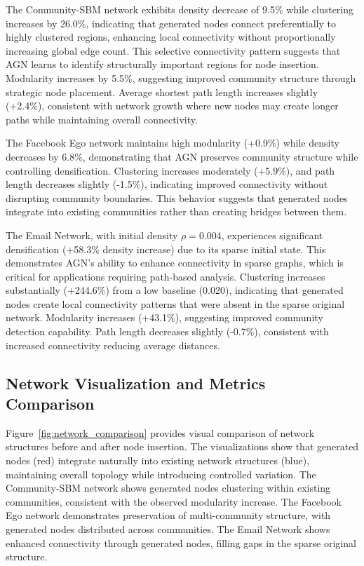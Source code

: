 \documentclass[12pt]{article}
\begin{document}
The Community-SBM network exhibits density decrease of 9.5\% while clustering increases by 26.0\%, indicating that generated nodes connect preferentially to highly clustered regions, enhancing local connectivity without proportionally increasing global edge count. This selective connectivity pattern suggests that AGN learns to identify structurally important regions for node insertion. Modularity increases by 5.5\%, suggesting improved community structure through strategic node placement. Average shortest path length increases slightly (+2.4\%), consistent with network growth where new nodes may create longer paths while maintaining overall connectivity.

The Facebook Ego network maintains high modularity (+0.9\%) while density decreases by 6.8\%, demonstrating that AGN preserves community structure while controlling densification. Clustering increases moderately (+5.9\%), and path length decreases slightly (-1.5\%), indicating improved connectivity without disrupting community boundaries. This behavior suggests that generated nodes integrate into existing communities rather than creating bridges between them.

The Email Network, with initial density $\rho = 0.004$, experiences significant densification (+58.3\% density increase) due to its sparse initial state. This demonstrates AGN's ability to enhance connectivity in sparse graphs, which is critical for applications requiring path-based analysis. Clustering increases substantially (+244.6\%) from a low baseline (0.020), indicating that generated nodes create local connectivity patterns that were absent in the sparse original network. Modularity increases (+43.1\%), suggesting improved community detection capability. Path length decreases slightly (-0.7\%), consistent with increased connectivity reducing average distances.

\subsection{Network Visualization and Metrics Comparison}

Figure~\ref{fig:network_comparison} provides visual comparison of network structures before and after node insertion. The visualizations show that generated nodes (red) integrate naturally into existing network structures (blue), maintaining overall topology while introducing controlled variation. The Community-SBM network shows generated nodes clustering within existing communities, consistent with the observed modularity increase. The Facebook Ego network demonstrates preservation of multi-community structure, with generated nodes distributed across communities. The Email Network shows enhanced connectivity through generated nodes, filling gaps in the sparse original structure.
\end{document}
